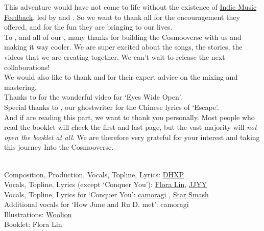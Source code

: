 
This adventure would have not come to life without the existence of \href{https://indiemusicfeedback.com}{Indie Music Feedback}, led by  and . So we want to thank all  for the encouragement they offered, and for the fun they are bringing to our lives.\\

To ,  and all of our , many thanks for building the Cosmooverse with us and making it way cooler. We are super excited about the songs, the stories, the videos that we are creating together. We can't wait to release the next collaborations!\\

We would also like to thank  and  for their expert advice on the mixing and mastering.\\

Thanks to  for the wonderful video for `Eyes Wide Open'.\\

Special thanks to , our ghostwriter for the Chinese lyrics of `Escape'.\\

And if  are reading this part, we want to thank you personally. Most people who read the booklet will check the first and last page, but the vast majority will \emph{not open the booklet at all}. We are therefore very grateful for your interest and taking this journey Into the Cosmooverse.

\clearpage



\phantom{*}\\
Composition, Production, Vocals, Topline, Lyrics: \href{https://linktr.ee/dhxp}{DHXP}\\
Vocals, Topline, Lyrics (except `Conquer You'): \href{https://www.youtube.com/channel/UC7pM7YKe9U1D1Xl4s_xroBw}{Flora Lin}, \href{https://instagram.com/teoritical}{JJYY} \\
Vocals, Topline, Lyrics for `Conquer You': \href{https://www.camoragi.com/}{camoragi} , \href{https://soundcloud.com/starsmashofficial}{Star Smash} \\
Additional vocals for `How June and Ru D. met': camoragi\\
Illustrations: \href{https://twitter.com/wooliondraws}{Woolion}\\
Booklet: Flora Lin

